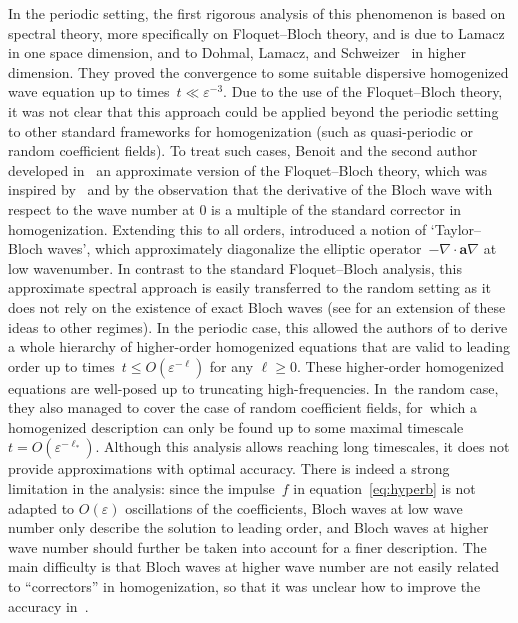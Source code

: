 \documentclass[JEP,XML,SOM,Unicode,published]{cedram}
\theoremstyle{plain}
\theoremstyle{definition}
\numberwithin{equation}{section}
\newcommand{\e}{\varepsilon}
\newcommand{\Aa}{\boldsymbol a}
\begin{document}
In the periodic setting, the first rigorous analysis of this phenomenon is based on spectral theory, more specifically on Floquet--Bloch theory, and is due to Lamacz~\cite{Lamacz-11} in one space dimension, and to Dohmal, Lamacz, and Schweizer~\cite{DLS-14,DLS-15}
in higher dimension.
They proved the convergence to some suitable dispersive homogenized wave equation up to times~\mbox{$t\ll \e^{-3}$}.
Due to the use of the Floquet--Bloch theory, it was not clear that this approach could be applied beyond the periodic setting to other standard frameworks for homogenization (such as quasi-periodic or random coefficient fields). To treat such cases, Benoit and the second author developed in~\cite{BG} an approximate version of the Floquet--Bloch theory, which was inspired by~\cite{ABV-16} and by the observation that the derivative of the Bloch wave with respect to the wave number at 0 is a multiple of the standard corrector in homogenization. Extending this to all orders, {\cite{BG}} introduced a notion of `Taylor--Bloch waves', which approximately diagonalize the elliptic operator~$-\nabla\cdot\Aa\nabla$ at low wavenumber. In contrast to the standard Floquet--Bloch analysis, this approximate spectral approach is easily {transferred} to the random setting as it does not rely on the existence of exact Bloch waves (see \cite{DGS} for an extension of these ideas to other regimes).
In the periodic case, this allowed {the authors of \cite{BG}} to derive a whole hierarchy of higher-order homogenized equations that are valid to leading order up to times~$t\le O(\e^{-\ell})$ for any $\ell\ge 0$.
These higher-order homogenized equations are well-posed up to truncating high-frequencies.
In~the random case, they also managed to cover the case of random coefficient fields, for~which a homo\-genized description can only be found up to some maximal timescale $t=O(\e^{-\ell_*})$.
Although this analysis allows reaching long timescales, it does not provide approximations with optimal accuracy. There is indeed a strong limitation in the analysis: since the impulse~$f$ in equation~\eqref{eq:hyperb} is not adapted to $O(\e)$ oscillations of the coefficients, Bloch waves at low wave number only describe the solution to leading order, and Bloch waves at higher wave number should further be taken into account for a finer description. The main difficulty is that Bloch waves at higher wave number are not easily related to ``correctors'' in homogenization, so that it was unclear how to improve the accuracy in~\cite{BG}.
\end{document}
